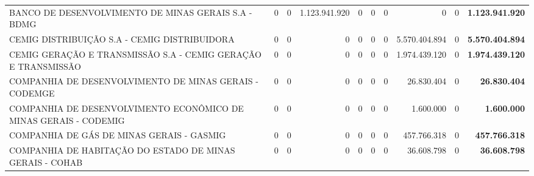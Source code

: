 \documentclass{article}
\begin{document}
\begin{longtable}[c]{m{2.0cm}|m{1.35cm}|m{1.35cm}|m{1.35cm}|m{1.35cm}|m{1.35cm}|m{1.35cm}|m{1.35cm}|m{1.35cm}|m{1.0cm}}
\multicolumn{1}{L{4cm}|}{BANCO DE DESENVOLVIMENTO DE MINAS GERAIS S.A - BDMG} & \multicolumn{1}{r|}{    0} & \multicolumn{1}{r|}{0} & \multicolumn{1}{r|}{1.123.941.920} & \multicolumn{1}{r|}{0} & \multicolumn{1}{r|}{0} & \multicolumn{1}{r|}{0} & \multicolumn{1}{r|}{            0} & \multicolumn{1}{r|}{0} & \multicolumn{1}{r}{ \textbf{1.123.941.920}} \\
\multicolumn{1}{L{4cm}|}{CEMIG DISTRIBUIÇÃO S.A - CEMIG DISTRIBUIDORA} & \multicolumn{1}{r|}{    0} & \multicolumn{1}{r|}{0} & \multicolumn{1}{r|}{            0} & \multicolumn{1}{r|}{0} & \multicolumn{1}{r|}{0} & \multicolumn{1}{r|}{0} & \multicolumn{1}{r|}{5.570.404.894} & \multicolumn{1}{r|}{0} & \multicolumn{1}{r}{ \textbf{5.570.404.894}} \\
\multicolumn{1}{L{4cm}|}{CEMIG GERAÇÃO E TRANSMISSÃO S.A - CEMIG GERAÇÃO E TRANSMISSÃO} & \multicolumn{1}{r|}{    0} & \multicolumn{1}{r|}{0} & \multicolumn{1}{r|}{            0} & \multicolumn{1}{r|}{0} & \multicolumn{1}{r|}{0} & \multicolumn{1}{r|}{0} & \multicolumn{1}{r|}{1.974.439.120} & \multicolumn{1}{r|}{0} & \multicolumn{1}{r}{ \textbf{1.974.439.120}} \\
\multicolumn{1}{L{4cm}|}{COMPANHIA DE DESENVOLVIMENTO DE MINAS GERAIS - CODEMGE} & \multicolumn{1}{r|}{    0} & \multicolumn{1}{r|}{0} & \multicolumn{1}{r|}{            0} & \multicolumn{1}{r|}{0} & \multicolumn{1}{r|}{0} & \multicolumn{1}{r|}{0} & \multicolumn{1}{r|}{26.830.404} & \multicolumn{1}{r|}{0} & \multicolumn{1}{r}{ \textbf{26.830.404}} \\
\multicolumn{1}{L{4cm}|}{COMPANHIA DE DESENVOLVIMENTO ECONÔMICO DE MINAS GERAIS - CODEMIG} & \multicolumn{1}{r|}{    0} & \multicolumn{1}{r|}{0} & \multicolumn{1}{r|}{            0} & \multicolumn{1}{r|}{0} & \multicolumn{1}{r|}{0} & \multicolumn{1}{r|}{0} & \multicolumn{1}{r|}{1.600.000} & \multicolumn{1}{r|}{0} & \multicolumn{1}{r}{ \textbf{1.600.000}} \\
\multicolumn{1}{L{4cm}|}{COMPANHIA DE GÁS DE MINAS GERAIS - GASMIG} & \multicolumn{1}{r|}{    0} & \multicolumn{1}{r|}{0} & \multicolumn{1}{r|}{            0} & \multicolumn{1}{r|}{0} & \multicolumn{1}{r|}{0} & \multicolumn{1}{r|}{0} & \multicolumn{1}{r|}{457.766.318} & \multicolumn{1}{r|}{0} & \multicolumn{1}{r}{ \textbf{457.766.318}} \\
\multicolumn{1}{L{4cm}|}{COMPANHIA DE HABITAÇÃO DO ESTADO DE MINAS GERAIS - COHAB} & \multicolumn{1}{r|}{    0} & \multicolumn{1}{r|}{0} & \multicolumn{1}{r|}{            0} & \multicolumn{1}{r|}{0} & \multicolumn{1}{r|}{0} & \multicolumn{1}{r|}{0} & \multicolumn{1}{r|}{36.608.798} & \multicolumn{1}{r|}{0} & \multicolumn{1}{r}{ \textbf{36.608.798}} \\

\end{longtable}
\end{document}
